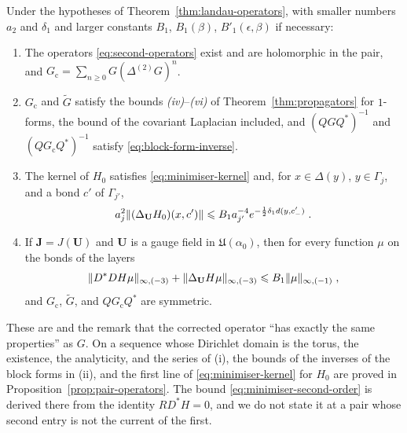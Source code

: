 \documentclass[11pt]{preprint}
\DeclarePairedDelimiter{\norm}{\lVert}{\rVert}
\numberwithin{equation}{section}
\begin{document}
\begin{proposition}\label{prop:second-operators}
Under the hypotheses of Theorem~\ref{thm:landau-operators}, with smaller numbers $a_2$ and $\delta_1$ and larger constants $B_1$, $B_1(\beta)$, $B'_1(\epsilon, \beta)$ if necessary:
\begin{enumerate}[label=(\roman*)]
\item The operators \eqref{eq:second-operators} exist and are holomorphic in the pair, and $G_{\mathrm c} = \sum_{n \geqslant 0}G(\Delta^{(2)}G)^n$.
\item $G_{\mathrm c}$ and $\tilde G$ satisfy the bounds \emph{(iv)}--\emph{(vi)} of Theorem~\ref{thm:propagators} for $1$-forms, the bound of the covariant Laplacian included, and $(QGQ^*)^{-1}$ and $(QG_{\mathrm c}Q^*)^{-1}$ satisfy \eqref{eq:block-form-inverse}.
\item The kernel of $H_0$ satisfies \eqref{eq:minimiser-kernel} and, for $x \in \Delta(y)$, $y \in \Gamma_j$, and a bond $c'$ of $\Gamma_{j'}$,
\begin{equation}\label{eq:second-minimiser-laplacian}
    a_j^2\norm{(\Delta_{\mathbf U}H_0)(x, c')} \leqslant B_1a_{j'}^{-4}e^{-\frac{1}{2}\delta_1d(y, c'_-)}\;.
\end{equation}
\item If $\mathbf J = J(\mathbf U)$ and $\mathbf U$ is a gauge field in $\mathfrak U(\alpha_0)$, then for every function $\mu$ on the bonds of the layers
\begin{equation}\label{eq:minimiser-second-order}
    \norm{D^*DH\mu}_{\infty,(-3)} + \norm{\Delta_{\mathbf U}H\mu}_{\infty,(-3)} \leqslant B_1\norm\mu_{\infty,(-1)}\;,
\end{equation}
and $G_{\mathrm c}$, $\tilde G$, and $QG_{\mathrm c}Q^*$ are symmetric.
\end{enumerate}
\end{proposition}

These are \cite[(129), (130), (137)--(140), pp.~297--299]{BalabanVAR} and the remark \cite[p.~306]{BalabanVAR} that the corrected operator ``has exactly the same properties'' as $G$. On a sequence whose Dirichlet domain is the torus, the existence, the analyticity, and the series of (i), the bounds of the inverses of the block forms in (ii), and the first line of \eqref{eq:minimiser-kernel} for $H_0$ are proved in Proposition~\ref{prop:pair-operators}. The bound \eqref{eq:minimiser-second-order} is derived there from the identity $RD^*H = 0$, and we do not state it at a pair whose second entry is not the current of the first.
\end{document}
